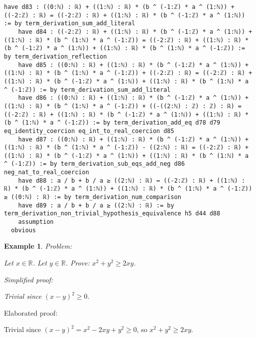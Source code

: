 \documentclass{article}
\newtheorem{example}{Example}
\begin{document}
\begin{tcolorbox}[colback=white!10, width=\linewidth]
\begin{lstlisting}[language=Lean4]
    have d83 : ((0:ℕ) : ℝ) + ((1:ℕ) : ℝ) * (b ^ (-1:ℤ) * a ^ (1:ℕ)) + ((-2:ℤ) : ℝ) = ((-2:ℤ) : ℝ) + ((1:ℕ) : ℝ) * (b ^ (-1:ℤ) * a ^ (1:ℕ)) := by term_derivation_sum_add_literal
    have d84 : ((-2:ℤ) : ℝ) + ((1:ℕ) : ℝ) * (b ^ (-1:ℤ) * a ^ (1:ℕ)) + ((1:ℕ) : ℝ) * (b ^ (1:ℕ) * a ^ (-1:ℤ)) = ((-2:ℤ) : ℝ) + ((1:ℕ) : ℝ) * (b ^ (-1:ℤ) * a ^ (1:ℕ)) + ((1:ℕ) : ℝ) * (b ^ (1:ℕ) * a ^ (-1:ℤ)) := by term_derivation_reflection
    have d85 : ((0:ℕ) : ℝ) + ((1:ℕ) : ℝ) * (b ^ (-1:ℤ) * a ^ (1:ℕ)) + ((1:ℕ) : ℝ) * (b ^ (1:ℕ) * a ^ (-1:ℤ)) + ((-2:ℤ) : ℝ) = ((-2:ℤ) : ℝ) + ((1:ℕ) : ℝ) * (b ^ (-1:ℤ) * a ^ (1:ℕ)) + ((1:ℕ) : ℝ) * (b ^ (1:ℕ) * a ^ (-1:ℤ)) := by term_derivation_sum_add_literal
    have d86 : ((0:ℕ) : ℝ) + ((1:ℕ) : ℝ) * (b ^ (-1:ℤ) * a ^ (1:ℕ)) + ((1:ℕ) : ℝ) * (b ^ (1:ℕ) * a ^ (-1:ℤ)) + ((-((2:ℕ) : ℤ) : ℤ) : ℝ) = ((-2:ℤ) : ℝ) + ((1:ℕ) : ℝ) * (b ^ (-1:ℤ) * a ^ (1:ℕ)) + ((1:ℕ) : ℝ) * (b ^ (1:ℕ) * a ^ (-1:ℤ)) := by term_derivation_add_eq d78 d79 eq_identity_coercion eq_int_to_real_coercion d85
    have d87 : ((0:ℕ) : ℝ) + ((1:ℕ) : ℝ) * (b ^ (-1:ℤ) * a ^ (1:ℕ)) + ((1:ℕ) : ℝ) * (b ^ (1:ℕ) * a ^ (-1:ℤ)) - ((2:ℕ) : ℝ) = ((-2:ℤ) : ℝ) + ((1:ℕ) : ℝ) * (b ^ (-1:ℤ) * a ^ (1:ℕ)) + ((1:ℕ) : ℝ) * (b ^ (1:ℕ) * a ^ (-1:ℤ)) := by term_derivation_sub_eqs_add_neg d86 neg_nat_to_real_coercion
    have d88 : a / b + b / a ≥ ((2:ℕ) : ℝ) ↔ ((-2:ℤ) : ℝ) + ((1:ℕ) : ℝ) * (b ^ (-1:ℤ) * a ^ (1:ℕ)) + ((1:ℕ) : ℝ) * (b ^ (1:ℕ) * a ^ (-1:ℤ)) ≥ ((0:ℕ) : ℝ) := by term_derivation_num_comparison
    have d89 : a / b + b / a ≥ ((2:ℕ) : ℝ) := by term_derivation_non_trivial_hypothesis_equivalence h5 d44 d88
    assumption
  obvious

\end{lstlisting}
\end{tcolorbox}


\begin{example}
Problem:
\begin{tcolorbox}[colback=yellow!10, width=\linewidth]
Let $x\in\mathbb{R}$. Let $y\in\mathbb{R}$.
    Prove: $x^2 + y^2 \ge 2xy$.
\end{tcolorbox}

Simplified proof:
\begin{tcolorbox}[colback=blue!10, width=\linewidth]
Trivial since $(x-y)^2 \ge 0$.
\end{tcolorbox}
\end{example}

Elaborated proof:
\begin{tcolorbox}[colback=green!10, width=\linewidth]
Trivial since $(x-y)^2 = x^2 -2xy + y^2 \ge 0$, so $x^2 + y^2 \ge 2xy$.
\end{tcolorbox}
\end{document}

